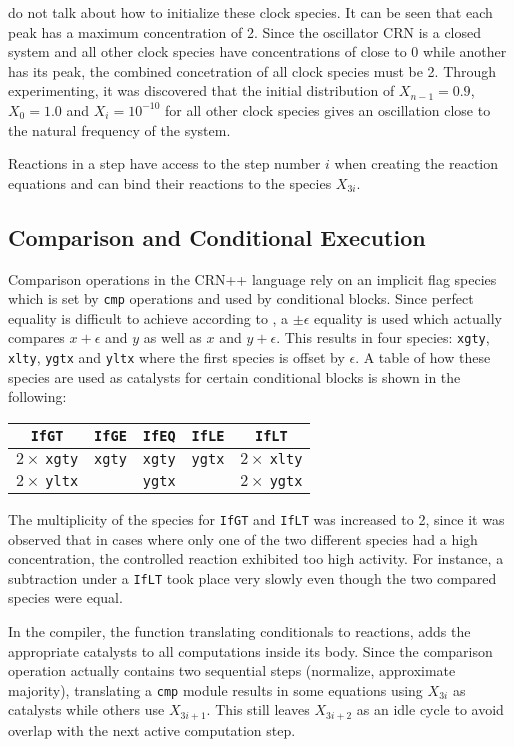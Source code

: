 \citeauthor{soloveichik2018a} do not talk about how to initialize these clock species. It can be seen that each peak has a maximum concentration of 2. Since the oscillator CRN is a closed system and all other clock species have concentrations of close to 0 while another has its peak, the combined concetration of all clock species must be 2. Through experimenting, it was discovered that the initial distribution of $X_{n-1}=0.9$, $X_{0}=1.0$ and $X_i=10^{-10}$ for all other clock species gives an oscillation close to the natural frequency of the system.

Reactions in a step have access to the step number $i$ when creating the reaction equations and can bind their reactions to the species $X_{3i}$.

\subsection{Comparison and Conditional Execution}
Comparison operations in the CRN++ language rely on an implicit flag species which is set by \texttt{cmp} operations and used by conditional blocks. Since perfect equality is difficult to achieve according to \citeauthor{soloveichik2018a}, a $\pm \epsilon$ equality is used which actually compares $x+\epsilon$ and $y$ as well as $x$ and $y+\epsilon$. This results in four species: \texttt{xgty}, \texttt{xlty}, \texttt{ygtx} and \texttt{yltx} where the first species is offset by $\epsilon$. A table of how these species are used as catalysts for certain conditional blocks is shown in the following:

\begin{center}
\begin{tabular}{c|c|c|c|c}
    \texttt{IfGT} & \texttt{IfGE} & \texttt{IfEQ} & \texttt{IfLE} & \texttt{IfLT} \\\hline
    $2\times\:$\texttt{xgty} & \texttt{xgty} & \texttt{xgty} & \texttt{ygtx} & $2\times\:$\texttt{xlty} \\
    $2\times\:$\texttt{yltx} & & \texttt{ygtx} & & $2\times\:$\texttt{ygtx}
\end{tabular}
\end{center}

The multiplicity of the species for \texttt{IfGT} and \texttt{IfLT} was increased to 2, since it was observed that in cases where only one of the two different species had a high concentration, the controlled reaction exhibited too high activity. For instance, a subtraction under a \texttt{IfLT} took place very slowly even though the two compared species were equal.

In the compiler, the function translating conditionals to reactions, adds the appropriate catalysts to all computations inside its body. Since the comparison operation actually contains two sequential steps (normalize, approximate majority), translating a \texttt{cmp} module results in some equations using $X_{3i}$ as catalysts while others use $X_{3i+1}$. This still leaves $X_{3i+2}$ as an idle cycle to avoid overlap with the next active computation step.

